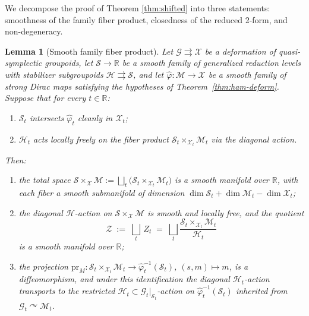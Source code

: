 \documentclass[reqno]{amsart}
\theoremstyle{plain}
\newtheorem{Lem}[Thm]{Lemma}
\theoremstyle{definition}
\newcommand{\R}{\mathbb{R}}
\newcommand{\G}{\mathcal{G}}
\renewcommand{\H}{\mathcal{H}}
\renewcommand{\S}{\mathcal{S}}
\newcommand{\M}{\mathcal{M}}
\newcommand{\X}{\mathcal{X}}
\begin{document}
We decompose the proof of Theorem \ref{thm:shifted} into three statements: smoothness of the family fiber product, closedness of the reduced 2-form, and non-degeneracy. 

\begin{Lem}[Smooth family fiber product]\label{lem:smooth-family-fibre-product}
Let $\G \rightrightarrows \X$ be a deformation of
quasi-symplectic groupoids, let $\S \to \R$ be a smooth family of generalized reduction levels with stabilizer subgroupoids $\H \rightrightarrows \S$, and let
$\hat\varphi \colon \M \to \X$ be a smooth family of
strong Dirac maps satisfying the hypotheses of
Theorem~\ref{thm:ham-deform}. Suppose that for every
$t \in \mathbb{R}$:
\begin{enumerate}[label=\textnormal{(\roman*)}]
  \item $\S_t$ intersects $\hat\varphi_t$ cleanly in $\X_t$;
  \item $\H_t$ acts locally freely on the fiber product
        $\S_t \times_{\X_t} \M_t$ via the diagonal action.
\end{enumerate}
Then:
\begin{enumerate}
  \item the total space
        $\S \times_{\X} \M
            := \bigsqcup_t \bigl(\S_t \times_{\X_t} \M_t\bigr)$
        is a smooth manifold over $\R$, with each fiber a smooth
        submanifold of dimension
        $\dim \S_t + \dim \M_t - \dim \X_t$;
  \item the diagonal $\mathcal{H}$-action on
        $\mathcal{S} \times_{\mathcal{X}} \mathcal{M}$ is smooth and locally
        free, and the quotient
        \[
           \mathcal{Z} \;:=\;
           \bigsqcup_t\, Z_t
           \;=\; \bigsqcup_t \frac{\S_t \times_{\X_t} \M_t}{\H_t}
        \]
        is a smooth manifold over $\mathbb{R}$;
  \item the projection $\mathrm{pr}_M \colon
        \S_t \times_{\X_t} \M_t \to \hat\varphi_t^{-1}(\S_t)$,
        $(s, m) \mapsto m$, is a diffeomorphism, and under this
        identification the diagonal $\H_t$-action transports to the
        restricted $\H_t \subset \mathcal{G}_t|_{\S_t}$-action on
        $\hat\varphi_t^{-1}(\S_t)$ inherited from
        $\mathcal{G}_t \curvearrowright \M_t$.
\end{enumerate}
\end{Lem}
 
\end{document}
